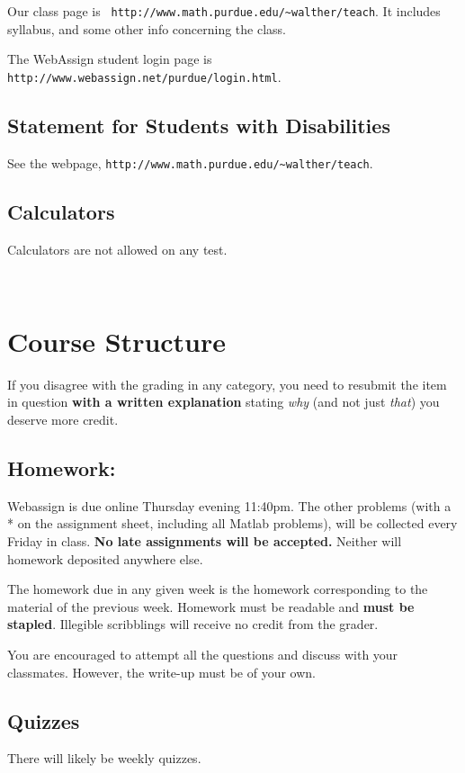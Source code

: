 \documentclass[10pt]{article}
\begin{document}
\noindent Our class page is {\tt
http://www.math.purdue.edu/\~{}walther/teach}. It includes syllabus,
and some other info concerning the class. \smallskip

\noindent The WebAssign student login page is {\tt http://www.webassign.net/purdue/login.html}.

\subsection{Statement for Students with Disabilities}
See the webpage, {\tt http://www.math.purdue.edu/\~{}walther/teach}.

\subsection{Calculators}
Calculators are not allowed on any test.

\newpage 
~
\vspace{-3cm}
\section{Course Structure}

If you disagree with the grading in any category, you need to resubmit
the item in question {\bf with a written explanation} stating {\em why} (and
not just {\em that}) you deserve more credit. 
\subsection{Homework:}   
        Webassign is due online Thursday evening 11:40pm.  The
        other problems (with a * on the assignment sheet, including
        all Matlab problems), will be collected every Friday in
        class. {\bf No late assignments will be accepted.}  
        Neither will homework deposited anywhere else.

	The homework due in any given week is the
	homework corresponding to the material of the previous
	week. Homework must be readable and {\bf must be stapled}. Illegible
	scribblings will receive no credit from the grader.

        You are encouraged to attempt all the questions and discuss
        with your classmates. However, the write-up must
        be of your own.

\subsection{Quizzes}
There will likely be weekly quizzes.
\end{document}

